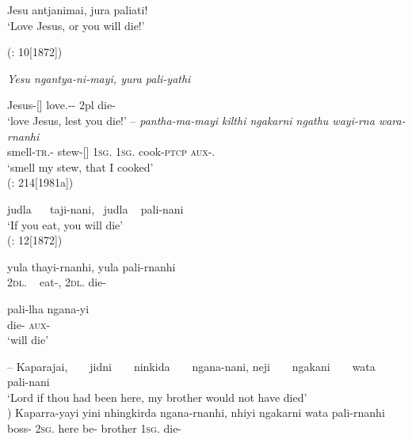 \documentclass{langscibook}
\begin{document}
\begin{xlist}
\begin{xlist}
\begin{xlist}
\ea
\label{bkm:Ref339715961}Jesu       antjanimai,                jura             paliati!\\
\glt `Love Jesus, or you will die!'

(\citealt{schoknecht_grammar_1947}: 10[1872])

\textit{Yesu       ngantya-ni-mayi,           yura           pali-yathi}

    Jesus-[]    love.--    2pl    die-\\
\glt `love Jesus, lest you die!'
\z
--
\ea\label{bkm:Ref339719815}
\gll \textit{pantha-ma-mayi          kilthi               ngakarni     ngathu     wayi-rna    wara-rnanhi} \\
smell-\textsc{tr}.-   stew-[]  1\textsc{sg}.    1\textsc{sg}.    cook-\textsc{ptcp}    \textsc{aux}-. \\
\glt `smell my stew, that I cooked' \\
(\citealt{austin_grammar_2013}: 214[1981a])
\z



\ea\label{bkm:Ref339728750}
judla ~   ~taji-nani,             ~judla ~              pali-nani\\
\glt    `If you eat, you will die' \\
(\citealt{schoknecht_grammar_1947}: 12[1872])
\z

\ea
\gll yula           thayi-rnanhi,   yula                 pali-rnanhi\\
2\textsc{dl}. ~  eat-,     2\textsc{dl}.          die-\\
\z






\ea
\gll \label{bkm:Ref340429075}pali-lha    ngana-yi\\
die-  \textsc{aux}-\\
\glt ‘will die’
\z




\label{bkm:Ref340429028}\label{fig:key:8-186}

--
\ea   Kaparajai, ~ ~ jidni ~ ~      ninkida ~ ~     ngana-nani,       neji ~ ~      ngakani ~  ~ wata ~ ~    pali-nani\\
\glt `Lord if thou had been here, my brother would not have died' \\
\citealt{reuther_testamenta_1897})
\gll Kaparra-yayi      yini           nhingkirda  ngana{}-rnanhi,   nhiyi      ngakarni       wata       pali-rnanhi\\
boss-  2\textsc{sg}.   here     be-       brother   1\textsc{sg}.         die-\\
\z






\end{xlist}
\end{xlist}
\end{xlist}
\end{document}
